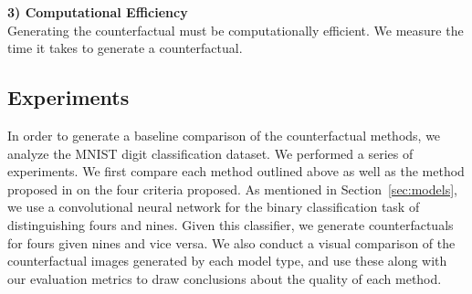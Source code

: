 \documentclass[letterpaper]{article} %
\begin{document}
\textbf{3) Computational Efficiency} \\
\noindent Generating the counterfactual must be computationally efficient. We measure the time it takes to generate a counterfactual.


\subsection{Experiments}

In order to generate a baseline comparison of the counterfactual methods, we analyze the MNIST digit classification dataset. We performed a series of experiments. We first compare each method outlined above as well as the method proposed in \cite{looveren2019interpretable} on the four criteria proposed. As mentioned in Section~\ref{sec:models}, we use a convolutional neural network for the binary classification task of distinguishing fours and nines. Given this classifier, we generate counterfactuals for fours given nines and vice versa. We also conduct a visual comparison of the counterfactual images generated by each model type, and use these along with our evaluation metrics to draw conclusions about the quality of each method.




\end{document}
